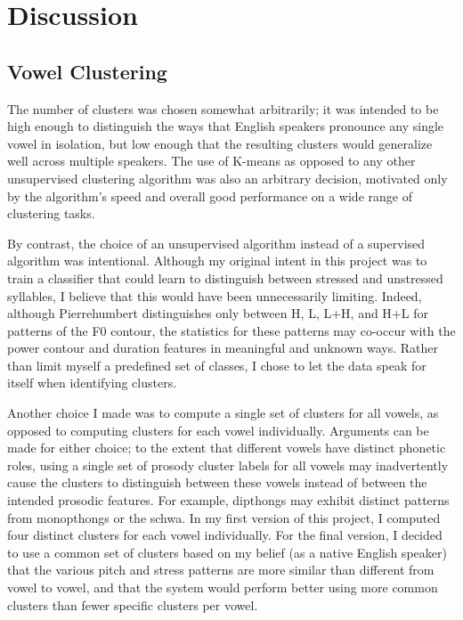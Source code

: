 \documentclass{article}
\begin{document}
\section{Discussion}
\label{sec:discussion}

\subsection{Vowel Clustering}
\label{ssec:discussvowels}

The number of clusters was chosen somewhat arbitrarily; it was intended to be high enough to distinguish the ways that English speakers pronounce any single vowel in isolation, but low enough that the resulting clusters would generalize well across multiple speakers.
The use of K-means as opposed to any other unsupervised clustering algorithm was also an arbitrary decision, motivated only by the algorithm's speed and overall good performance on a wide range of clustering tasks.

By contrast, the choice of an unsupervised algorithm instead of a supervised algorithm was intentional.
Although my original intent in this project was to train a classifier that could learn to distinguish between stressed and unstressed syllables, I believe that this would have been unnecessarily limiting.
Indeed, although Pierrehumbert \cite{pierrehumbert1980phonology} distinguishes only between H, L, L+H, and H+L for patterns of the F0 contour, the statistics for these patterns may co-occur with the power contour and duration features in meaningful and unknown ways. Rather than limit myself a predefined set of classes, I chose to let the data speak for itself when identifying clusters.

Another choice I made was to compute a single set of clusters for all vowels, as opposed to computing clusters for each vowel individually.
Arguments can be made for either choice; to the extent that different vowels have distinct phonetic roles, using a single set of prosody cluster labels for all vowels may inadvertently cause the clusters to distinguish between these vowels instead of between the intended prosodic features. For example, dipthongs may exhibit distinct patterns from monopthongs or the schwa.
In my first version of this project, I computed four distinct clusters for each vowel individually. For the final version, I decided to use a common set of clusters based on my belief (as a native English speaker) that the various pitch and stress patterns are more similar than different from vowel to vowel, and that the system would perform better using more common clusters than fewer specific clusters per vowel.
\end{document}
